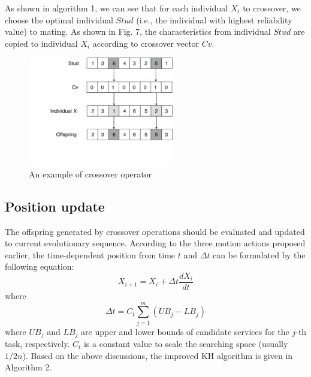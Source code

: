 \documentclass[journal]{IEEEtran}
\begin{document}
As shown in algorithm 1, we can see that for each individual $X_i$ to crossover, we choose the optimal individual $Stud$ (i.e., the individual with highest reliability value) to mating. As shown in Fig. 7, the characteristics from individual $Stud$ are copied to individual $X_i$ according to crossover vector $Cv$. 

\begin{figure}[!t]
\centering
\includegraphics[width=2.5in]{./img/pic5.pdf}
\caption{An example of crossover operator}
\label{Crossover operator}
\end{figure}

\subsection{Position update}
The offspring generated by crossover operations should be evaluated and updated to current evolutionary sequence.
According to the three motion actions proposed earlier, the time-dependent position from time $t$ and $\Delta t$ can be formulated by the following equation:
\begin{equation}
X_{i+1} = X_i + \Delta t \frac{dX_i}{dt}
\end{equation}
where
\begin{equation}
\Delta t = C_t\sum_{j=1}^{m}(UB_j - LB_j)
\end{equation}
where $UB_j$ and $LB_j$ are upper and lower bounds of candidate services for the $j$-th task, respectively. $C_t$ is a constant value to scale the searching space (usually $1/2n$). 
Based on the above discussions, the improved KH algorithm is given in Algorithm 2.
\end{document}
